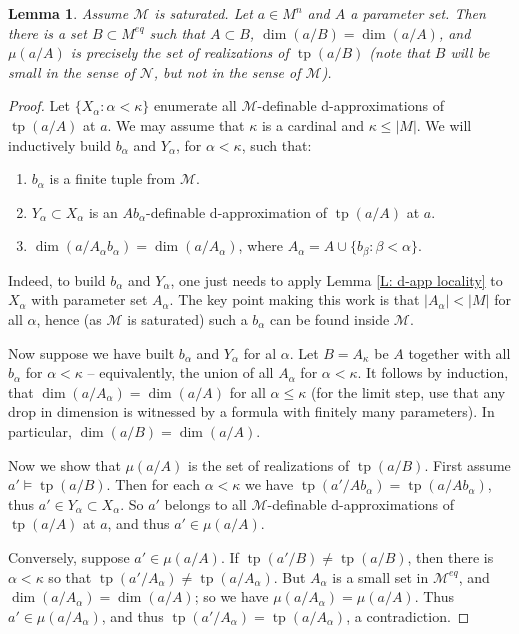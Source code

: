 \documentclass{amsart}
\newtheorem{lemma}[theorem]{Lemma}
\theoremstyle{definition}
\newcommand{\tp}{\operatorname{tp}}
\begin{document}
    \begin{lemma}
        Assume $\mathcal M$ is saturated. Let $a\in M^n$ and $A$ a parameter set. Then there is a set $B\subset M^{eq}$ such that $A\subset B$, $\dim(a/B)=\dim(a/A)$, and $\mu(a/A)$ is precisely the set of realizations of $\tp(a/B)$ (note that $B$ will be small in the sense of $\mathcal N$, but not in the sense of $\mathcal M$).
    \end{lemma}
    \begin{proof}
        Let $\{X_\alpha:\alpha<\kappa\}$  enumerate  all $\mathcal M$-definable d-approximations of $\tp(a/A)$ at $a$. We may assume that $\kappa$ is a cardinal and $\kappa\leq|M|$. We will inductively build $b_{\alpha}$ and $Y_{\alpha}$, for $\alpha<\kappa$, such that:
        \begin{enumerate}
            \item $b_\alpha$ is a finite tuple from $\mathcal M$.
            \item $Y_{\alpha}\subset X_{\alpha}$ is an $Ab_{\alpha}$-definable d-approximation of $\tp(a/A)$ at $a$.
            \item $\dim(a/A_{\alpha}b_{\alpha})=\dim(a/A_{\alpha})$, where $A_{\alpha}=A\cup\{b_{\beta}:\beta<\alpha\}$. \end{enumerate}

            Indeed, to build $b_{\alpha}$ and $Y_{\alpha}$, one just needs to apply Lemma \ref{L: d-app locality} to $X_\alpha$ with parameter set $A_{\alpha}$. The key point making this work is that $|A_{\alpha}|<|M|$ for all $\alpha$, hence (as $\mathcal M$ is saturated) such a $b_{\alpha}$ can be found inside $\mathcal M$.
            
            Now suppose we have built $b_{\alpha}$ and $Y_{\alpha}$ for al $\alpha$. Let $B=A_{\kappa}$ be $A$ together with all $b_{\alpha}$ for $\alpha<\kappa$ -- equivalently, the union of all $A_{\alpha}$ for $\alpha<\kappa$. It follows by induction, that $\dim(a/A_{\alpha})=\dim(a/A)$ for all $\alpha\leq\kappa$ (for the limit step, use that any drop in dimension is witnessed by a formula with finitely many parameters). In particular, $\dim(a/B)=\dim(a/A)$. 
            
            Now we show that $\mu(a/A)$ is the set of realizations of $\tp(a/B)$. First assume $a'\models\tp(a/B)$. Then for each $\alpha<\kappa$ we have $\tp(a'/Ab_{\alpha})=\tp(a/Ab_{\alpha})$, thus $a'\in Y_{\alpha}\subset X_{\alpha}$. So $a'$ belongs to all $\mathcal M$-definable d-approximations of $\tp(a/A)$ at $a$, and thus $a'\in\mu(a/A)$.
            
            Conversely, suppose $a'\in\mu(a/A)$. If $\tp(a'/B)\neq\tp(a/B)$, then there is $\alpha<\kappa$ so that $\tp(a'/A_{\alpha})\neq\tp(a/A_{\alpha})$. But $A_{\alpha}$ is a small set in $\mathcal M^{eq}$, and $\dim(a/A_{\alpha})=\dim(a/A)$; so we have $\mu(a/A_{\alpha})=\mu(a/A)$. Thus $a'\in\mu(a/A_{\alpha})$, and thus $\tp(a'/A_{\alpha})=\tp(a/A_{\alpha})$, a contradiction.
    \end{proof}
\end{document}

